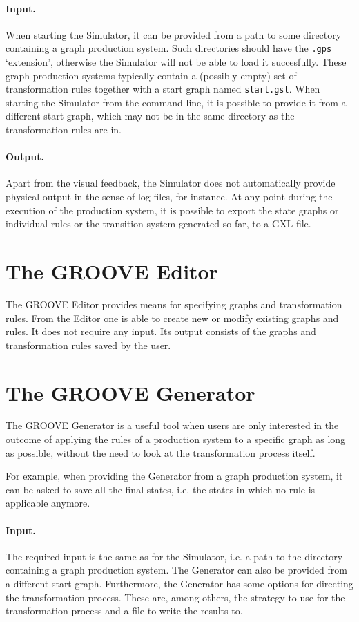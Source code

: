 \paragraph{Input.} When starting the Simulator, it can be provided from a path to some directory containing a graph production system. Such directories should have the \texttt{.gps} `extension', otherwise the Simulator will not be able to load it succesfully. These graph production systems typically contain a (possibly empty) set of transformation rules together with a start graph named \texttt{start.gst}. When starting the Simulator from the command-line, it is possible to provide it from a different start graph, which may not be in the same directory as the transformation rules are in.

\paragraph{Output.} Apart from the visual feedback, the Simulator does not automatically provide physical output in the sense of log-files, for instance. At any point during the execution of the production system, it is possible to export the state graphs or individual rules or the transition system generated so far, to a GXL-file.


\section{The GROOVE Editor}

The GROOVE Editor provides means for specifying graphs and transformation rules. From the Editor one is able to create new or modify existing graphs and rules. It does not require any input. Its output consists of the graphs and transformation rules saved by the user.


\section{The GROOVE Generator}

The GROOVE Generator is a useful tool when users are only interested in the outcome of applying the rules of a production system to a specific graph as long as possible, without the need to look at the transformation process itself.

For example, when providing the Generator from a graph production system, it can be asked to save all the final states, i.e. the states in which no rule is applicable anymore.

\paragraph{Input.} The required input is the same as for the Simulator, i.e. a path to the directory containing a graph production system. The Generator can also be provided from a different start graph. Furthermore, the Generator has some options for directing the transformation process. These are, among others, the strategy to use for the transformation process and a file to write the results to.

